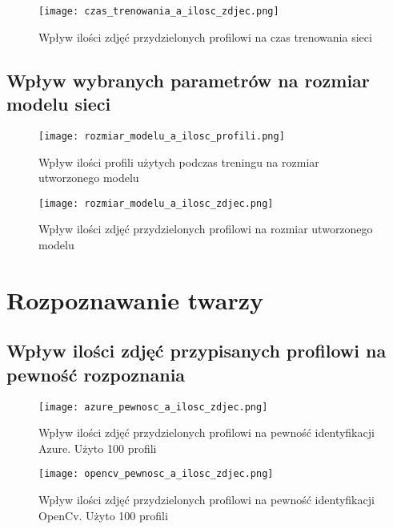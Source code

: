 \begin{figure}[H]
	\centering
	\texttt{[image: czas\_trenowania\_a\_ilosc\_zdjec.png]}
	\caption{Wpływ ilości zdjęć przydzielonych profilowi na czas trenowania sieci}
	\label{fig:czas_t_zdjecia}
\end{figure}

\subsection{Wpływ wybranych parametrów na rozmiar modelu sieci}
\begin{figure}[H]
	\centering
	\texttt{[image: rozmiar\_modelu\_a\_ilosc\_profili.png]}
	\caption{Wpływ ilości profili użytych podczas treningu na rozmiar utworzonego modelu}
	\label{fig:rozmiar_profile}
\end{figure}

\begin{figure}[H]
	\centering
	\texttt{[image: rozmiar\_modelu\_a\_ilosc\_zdjec.png]}
	\caption{Wpływ ilości zdjęć przydzielonych profilowi na rozmiar utworzonego modelu}
	\label{fig:rozmiar_zdjecia}
\end{figure}

\section{Rozpoznawanie twarzy} \label{b:rozpoznawanie}
\subsection{Wpływ ilości zdjęć przypisanych profilowi na pewność rozpoznania}
\begin{figure}[H]
	\centering
	\texttt{[image: azure\_pewnosc\_a\_ilosc\_zdjec.png]}
	\caption{Wpływ ilości zdjęć przydzielonych profilowi na pewność identyfikacji Azure. Użyto 100 profili}
	\label{fig:azure_zdjecia}
\end{figure}
\begin{figure}[H]
	\centering
	\texttt{[image: opencv\_pewnosc\_a\_ilosc\_zdjec.png]}
	\caption{Wpływ ilości zdjęć przydzielonych profilowi na pewność identyfikacji OpenCv. Użyto 100 profili}
	\label{fig:opencv_zdjecia}
\end{figure}

